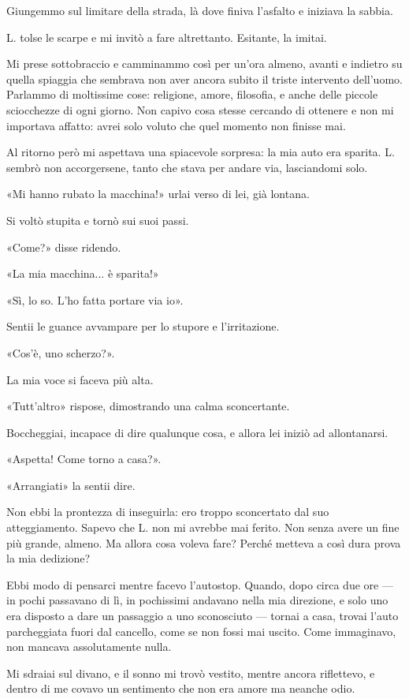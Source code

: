 \documentclass[a4paper,12pt]{book}
\begin{document}
Giungemmo sul limitare della strada, là dove finiva l'asfalto e iniziava la
sabbia.

L. tolse le scarpe e mi invitò a fare altrettanto. Esitante, la imitai.

Mi prese sottobraccio e camminammo così per un'ora almeno, avanti e indietro
su quella spiaggia che sembrava non aver ancora subito il triste intervento
dell'uomo. Parlammo di moltissime cose: religione, amore, filosofia, e anche
delle piccole sciocchezze di ogni giorno. Non capivo cosa stesse cercando di
ottenere e non mi importava affatto: avrei solo voluto che quel momento non
finisse mai.

Al ritorno però mi aspettava una spiacevole sorpresa: la mia auto era sparita.
L. sembrò non accorgersene, tanto che stava per andare via, lasciandomi solo.

«Mi hanno rubato la macchina!» urlai verso di lei, già lontana.

Si voltò stupita e tornò sui suoi passi.

«Come?» disse ridendo.

«La mia macchina... è sparita!»

«Sì, lo so. L'ho fatta portare via io».

Sentii le guance avvampare per lo stupore e l'irritazione.

«Cos'è, uno scherzo?».

La mia voce si faceva più alta.

«Tutt'altro» rispose, dimostrando una calma sconcertante.

Boccheggiai, incapace di dire qualunque cosa, e allora lei iniziò ad
allontanarsi.

«Aspetta! Come torno a casa?».

«Arrangiati» la sentii dire.

Non ebbi la prontezza di inseguirla: ero troppo sconcertato dal suo
atteggiamento. Sapevo che L. non mi avrebbe mai ferito. Non senza avere un fine
più grande, almeno. Ma allora cosa voleva fare? Perché metteva a così dura prova
la mia dedizione?

Ebbi modo di pensarci mentre facevo l'autostop. Quando, dopo circa due ore ---
in pochi passavano di lì, in pochissimi andavano nella mia direzione, e solo
uno era disposto a dare un passaggio a uno sconosciuto --- tornai a casa, trovai
l'auto parcheggiata fuori dal cancello, come se non fossi mai uscito. Come
immaginavo, non mancava assolutamente nulla.

Mi sdraiai sul divano, e il sonno mi trovò vestito, mentre ancora riflettevo, e
dentro di me covavo un sentimento che non era amore ma neanche odio.
\end{document}
